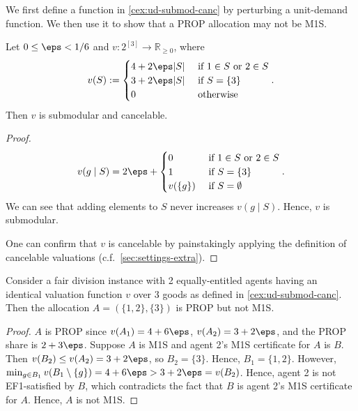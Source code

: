 We first define a function in \cref{cex:ud-submod-canc} by perturbing a unit-demand function.
We then use it to show that a PROP allocation may not be M1S.

\begin{lemma}
\label{cex:ud-submod-canc}
Let $0 \le \eps < 1/6$ and $v: 2^{[3]} \to \mathbb{R}_{\ge 0}$, where
\[ v(S) := \begin{cases}
4 + 2\eps|S| & \textrm{ if } 1 \in S \textrm{ or } 2 \in S
\\ 3 + 2\eps|S| & \textrm{ if } S = \{3\}
\\ 0 & \textrm{ otherwise}
\end{cases}. \]
Then $v$ is submodular and cancelable.
\end{lemma}
\begin{proof}
\[ v(g \mid S) = 2\eps + \begin{cases}
0 & \textrm{ if } 1 \in S \textrm{ or } 2 \in S
\\ 1 & \textrm{ if } S = \{3\}
\\ v(\{g\}) & \textrm{ if } S = \emptyset
\end{cases}. \]
We can see that adding elements to $S$ never increases $v(g \mid S)$.
Hence, $v$ is submodular.

One can confirm that $v$ is cancelable by painstakingly applying the definition of cancelable valuations
(c.f.~\cref{sec:settings-extra}).
\end{proof}

\begin{lemma}
\label{cex:prop-not-m1s-submod}
Consider a fair division instance with 2 equally-entitled agents
having an identical valuation function $v$ over 3 goods as defined in \cref{cex:ud-submod-canc}.
Then the allocation $A = (\{1, 2\}, \{3\})$ is PROP but not M1S.
\end{lemma}
\begin{proof}
$A$ is PROP since $v(A_1) = 4+6\eps$, $v(A_2) = 3+2\eps$, and the PROP share is $2+3\eps$.
Suppose $A$ is M1S and agent 2's M1S certificate for $A$ is $B$.
Then $v(B_2) \le v(A_2) = 3 + 2\eps$, so $B_2 = \{3\}$. Hence, $B_1 = \{1, 2\}$.
However, $\min_{g \in B_1} v(B_1 \setminus \{g\}) = 4 + 6\eps > 3 + 2\eps = v(B_2)$.
Hence, agent 2 is not EF1-satisfied by $B$, which contradicts the fact that $B$
is agent 2's M1S certificate for $A$. Hence, $A$ is not M1S.
\end{proof}
